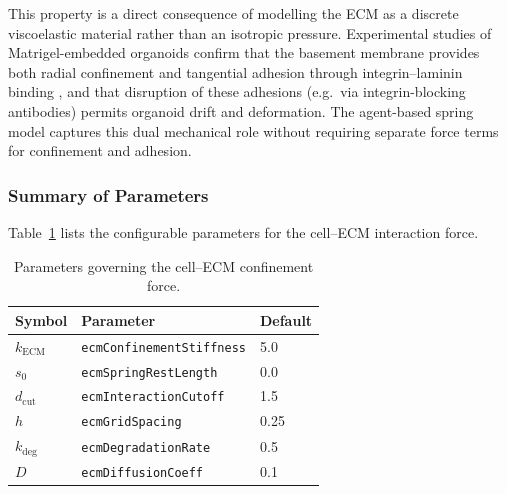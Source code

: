 This property is a direct consequence of modelling the ECM as a discrete viscoelastic material rather than an isotropic pressure.
Experimental studies of Matrigel-embedded organoids confirm that the basement membrane provides both radial confinement and tangential adhesion through integrin--laminin binding \cite{Gjorevski2016}, and that disruption of these adhesions (e.g.\ via integrin-blocking antibodies) permits organoid drift and deformation.
The agent-based spring model captures this dual mechanical role without requiring separate force terms for confinement and adhesion.

\subsubsection{Summary of Parameters}

Table~\ref{tab:ecm_params} lists the configurable parameters for the cell--ECM interaction force.

\begin{table}[h]
    \centering
    \caption{Parameters governing the cell--ECM confinement force.}
    \label{tab:ecm_params}
    \begin{tabular}{lll}
        \hline
        \textbf{Symbol} & \textbf{Parameter} & \textbf{Default} \\
        \hline
        $k_{\text{ECM}}$  & \texttt{ecmConfinementStiffness} & 5.0 \\
        $s_0$             & \texttt{ecmSpringRestLength}     & 0.0 \\
        $d_{\text{cut}}$  & \texttt{ecmInteractionCutoff}    & 1.5 \\
        $h$               & \texttt{ecmGridSpacing}          & 0.25 \\
        $k_{\text{deg}}$  & \texttt{ecmDegradationRate}      & 0.5 \\
        $D$               & \texttt{ecmDiffusionCoeff}       & 0.1 \\
        \hline
    \end{tabular}
\end{table}
